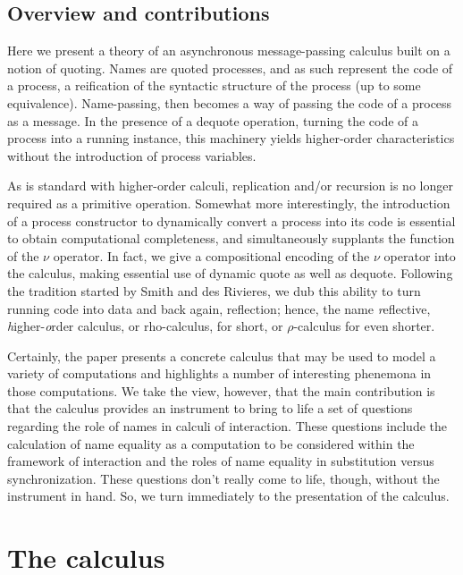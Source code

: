\documentclass[]{entcs}
\begin{document}
\subsection{Overview and contributions} 

Here we present a theory of an asynchronous message-passing calculus
built on a notion of quoting. Names are quoted processes, and as such
represent the code of a process, a reification of the syntactic
structure of the process (up to some equivalence). Name-passing, then
becomes a way of passing the code of a process as a message. In the
presence of a dequote operation, turning the code of a process into a
running instance, this machinery yields higher-order characteristics
without the introduction of process variables.

As is standard with higher-order calculi, replication and/or recursion
is no longer required as a primitive operation. Somewhat more
interestingly, the introduction of a process constructor to
dynamically convert a process into its code is essential to obtain
computational completeness, and simultaneously supplants the function
of the $\nu$ operator. In fact, we give a compositional encoding of
the $\nu$ operator into the calculus, making essential use of dynamic
quote as well as dequote. Following the tradition started by Smith and
des Rivieres, \cite{lisp3} we dub this ability to turn running code
into data and back again, reflection; hence, the name
\textit{r}eflective,
\textit{h}igher-\textit{o}rder calculus, or rho-calculus, for short,
or $\rho$-calculus for even shorter.

Certainly, the paper presents a concrete calculus that may be used to
model a variety of computations and highlights a number of interesting
phenemona in those computations. We take the view, however, that the
main contribution is that the calculus provides an instrument to bring
to life a set of questions regarding the role of names in calculi of
interaction. These questions include the calculation of name equality
as a computation to be considered within the framework of interaction
and the roles of name equality in substitution versus
synchronization. These questions don't really come to life, though,
without the instrument in hand. So, we turn immediately to the
presentation of the calculus.


\section{The calculus}
\end{document}
